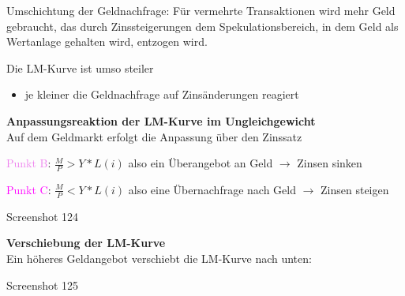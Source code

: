 \documentclass[11pt]{article}
\begin{document}
\begin{enumerate}
Umschichtung der Geldnachfrage: Für vermehrte Transaktionen wird mehr Geld gebraucht, das durch Zinssteigerungen dem Spekulationsbereich, in dem Geld als Wertanlage gehalten wird, entzogen wird.

Die LM-Kurve ist umso steiler
\begin{itemize}
\item je kleiner die Geldnachfrage auf Zinsänderungen reagiert
\end{itemize}

\textbf{Anpassungsreaktion der LM-Kurve im Ungleichgewicht}\\
Auf dem Geldmarkt erfolgt die Anpassung über den Zinssatz

\textcolor{violet}{Punkt B}: \(\frac{M}{P} > Y * L(i)\) also ein Überangebot an Geld \(\rightarrow\) Zinsen sinken

\textcolor{magenta}{Punkt C}: \(\frac{M}{P} < Y * L(i)\) also eine Übernachfrage nach Geld \(\rightarrow\) Zinsen steigen

Screenshot 124

\textbf{Verschiebung der LM-Kurve}\\
Ein höheres Geldangebot verschiebt die LM-Kurve nach unten:

Screenshot 125
\end{enumerate}
\end{document}
